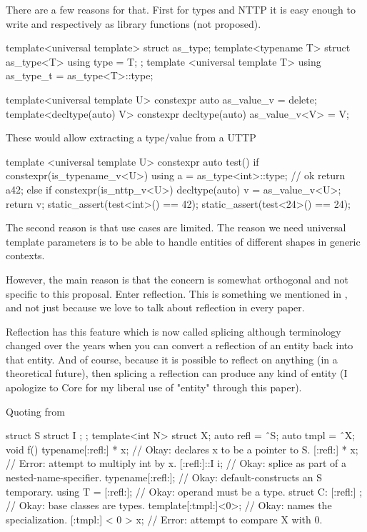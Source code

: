 \documentclass{wg21}
\begin{document}
There are a few reasons for that.
First for types and NTTP it is easy enough to write  and  respectively as library functions (not proposed).

\begin{colorblock}
template<universal template>
struct as_type;
template<typename T>
struct as_type<T> { using type = T; };
template <universal template T>
using as_type_t = as_type<T>::type;

template<universal template U>
constexpr auto as_value_v = delete;
template<decltype(auto) V>
constexpr decltype(auto) as_value_v<V> = V;
\end{colorblock}

These would allow extracting a type/value from a UTTP

\begin{colorblock}
template <universal template U>
constexpr auto test() {
    if constexpr(is_typename_v<U>) {
        using a =  as_type<int>::type; // ok
        return a{42};
    }
    else if constexpr(is_nttp_v<U>) {
        decltype(auto) v = as_value_v<U>;
        return v;
    }
}
static_assert(test<int>() == 42);
static_assert(test<24>() == 24);
\end{colorblock}

The second reason is that use cases are limited.
The reason we need universal template parameters is to be able to handle entities of different shapes in generic contexts.

However, the main reason is that the concern is somewhat orthogonal and not specific to this proposal.
Enter reflection.
This is something we mentioned in , and not just because we love to talk about reflection in every paper.

Reflection has this feature which is now called splicing although terminology changed over the years when you can convert a reflection of an entity
back into that entity. And of course, because it is possible to reflect on anything (in a theoretical future), then splicing a reflection
can produce any kind of entity (I apologize to Core for my liberal use of "entity" through this paper).

Quoting from 

\begin{quoteblock}
\begin{colorblock}
struct S { struct I { }; };
template<int N> struct X;
auto refl = ˆS;
auto tmpl = ˆX;
void f() {
    typename[:refl:] * x; // Okay: declares x to be a pointer to S.
    [:refl:] * x; // Error: attempt to multiply int by x.
    [:refl:]::I i; // Okay: splice as part of a nested-name-specifier.
    typename[:refl:]{}; // Okay: default-constructs an S temporary.
    using T = [:refl:]; // Okay: operand must be a type.
    struct C: [:refl:] {}; // Okay: base classes are types.
    template[:tmpl:]<0>; // Okay: names the specialization.
    [:tmpl:] < 0 > x; // Error: attempt to compare X with 0.
}
\end{colorblock}
\end{quoteblock}
\end{document}
